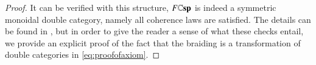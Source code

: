 \documentclass[reqno]{amsart}
\begin{document}
\begin{proof}
\begin{comment}
The globular 2-morphism $\chi \colon (M_1 \otimes N_1) \odot (M_2 \otimes N_2) \to (M_1 \odot M_2) \otimes (N_1 \odot N_2)$ is then given by the map of cospans in $\A$:
\[
\begin{tikzpicture}[scale=1.5]
\node (A) at (0,0.5) {$a+a'$};
\node (A') at (0,-0.5) {$a+a'$};
\node (B) at (2.5,0.5) {$(m_1+n_1)+_{b+b'}(m_2+n_2)$};
\node (C) at (5,0.5) {$c+c'$};
\node (C') at (5,-0.5) {$c+c'$};
\node (D) at (2.5,-0.5) {$(m_1+_{b}m_2)+(n_1+_{b'}n_2)$};
\node (E) at (7.5,0.5) {$\scriptstyle{(x_1+y_1) \odot (x_2+y_2) \in F((m_1+n_1)+_{b+b'}(m_2+n_2))}$};
\node (F) at (7.5,-0.5) {$\scriptstyle{(x_1 \odot x_2)+(y_1 \odot y_2) \in F((m_1+_{b}m_2)+(n_1+_{b'}n_2))}$};
\path[->,font=\scriptsize,>=angle 90]
(A) edge node[above]{$\psi j(i_1+i_1')$} (B)
(C) edge node[above]{$\psi j(o_2 + o_2')$} (B)
(A) edge node[left]{$1$} (A')
(C) edge node[right]{$1$} (C')
(A') edge node [above]{$(\psi j i_1')+(\psi j i_1)$} (D)
(C') edge node [above]{$(\psi j o_2)+(\psi j o_2')$} (D)
(B) edge node [left] {$\hat{\chi}$} (D);
\end{tikzpicture}
\]
together with decoration isomorphism $\tau_{\chi} \maps F(\hat{\chi})((x_1+y_1)\odot(x_2+y_2)) \to (x_1 \odot x_2)+(y_1 \odot y_2)$
where $\hat{\chi}$ is the same interchange map $\chi$ for the symmetric double category $\lCsp(\A)$ given by the universal map between the colimit of the same diagram obtained in two different ways. This completes the description of the globular 2-morphisms $\chi$ and $\mu$, and the description of all of the structure of the symmetric monoidal double category $F\lCsp$.
\end{comment}

It can be verified with this structure, $F\mathbf{\mathbb Csp}$ is indeed a symmetric monoidal double category, namely all coherence laws are satisfied. The details can be found in \cite[Theorem 4.1.3]{CourserThesis}, but in order to give the reader a sense of what these checks entail, we provide an explicit proof of the fact that the braiding is a transformation of double categories in \cref{eq:proofofaxiom}.  \end{proof}
\end{document}
